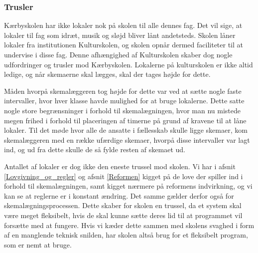 \subsubsection*{Trusler}
Kærbyskolen har ikke lokaler nok på skolen til alle dennes fag. Det vil sige, at lokaler til fag som idræt, musik og sløjd bliver lånt andetsteds. Skolen låner lokaler fra institutionen Kulturskolen, og skolen opnår dermed faciliteter til at undervise i disse fag. Denne afhængighed af Kulturskolen skaber dog nogle udfordringer og trusler mod Kærbyskolen. Lokalerne på kulturskolen er ikke altid ledige, og når skemaerne skal lægges, skal der tages højde for dette. 

Måden hvorpå skemalæggeren tog højde for dette var ved at sætte nogle faste intervaller, hvor hver klasse havde mulighed for at bruge lokalerne. Dette satte nogle store begrænsninger i forhold til skemalægningen, hvor man nu mistede megen frihed i forhold til placeringen af timerne på grund af kravene til at låne lokaler. Til det møde hvor alle de ansatte i fællesskab skulle ligge skemaer, kom skemalæggeren med en række ufærdige skemaer, hvorpå disse intervaller var lagt ind, og ud fra dette skulle de så fylde resten af skemaet ud.  

Antallet af lokaler er dog ikke den eneste trussel mod skolen. Vi har i afsnit \ref{Lovgivning_og_regler} og afsnit \ref{Reformen} kigget på de love der spiller ind i forhold til skemalægningen, samt kigget nærmere på reformens indvirkning, og vi kan se at reglerne er i konstant ændring. Det samme gælder derfor også for skemalægningsprocessen. Dette skaber for skolen en trussel, da et system skal være meget fleksibelt, hvis de skal kunne sætte deres lid til at programmet vil forsætte med at fungere. Hvis vi kæder dette sammen med skolens svaghed i form af en manglende teknisk snilden, har skolen altså brug for et fleksibelt program, som er nemt at bruge.
